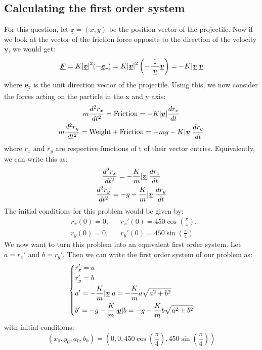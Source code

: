 \documentclass[12pt]{article}
\newcommand{\vect}[1]{\underline{\boldsymbol{#1}}}
\begin{document}
\subsection{Calculating the first order system}
For this question, let $\vect{r}=(x,y)$ be the position vector of the projectile. Now if we look at the vector of the friction force opposite to the direction of the velocity $\vect{v}$, we would get:
\begin{equation*}
  \vect{F} = K\abs{\vect{v}}^2(-\vect{e}_r) = K\abs{\vect{v}}^2\left(-\frac{1}{\abs{\vect{v}}}\vect{v}\right) = -K\abs{\vect{v}}\vect{v}
\end{equation*}
where $\vect{e_r}$ is the unit direction vector of the projectile. Using this, we now consider the forces acting on the particle in the x and y axis:
\begin{gather*}
  m\dv[2]{r_x}{t} = \text{Friction} = -K\abs{\vect{v}}\dv{r_x}{t} \\
  m\dv[2]{r_y}{t} = \text{Weight} + \text{Friction} = -mg - K\abs{\vect{v}}\dv{r_y}{t}
\end{gather*}
where $r_x$ and $r_y$ are respective functions of t of their vector entries. Equivalently, we can write this as:
\begin{gather*}
  \dv[2]{r_x}{t} = -\frac{K}{m}\abs{\vect{v}}\dv{r_x}{t} \\
  \dv[2]{r_y}{t} = -g - \frac{K}{m}\abs{\vect{v}}\dv{r_y}{t}
\end{gather*}
The initial conditions for this problem would be given by:
\begin{align*}
  &r_x(0) = 0,   &&r_x'(0) = 450\cos(\frac{\pi}{4}), \\
  &r_y(0) = 0,   &&r_y'(0) = 450\sin(\frac{\pi}{4})
\end{align*}
We now want to turn this problem into an equivalent first order system. Let $a=r_x'$ and $b=r_y'$. Then we can write the first order system of our problem as:
\begin{equation*}
  \left\{
    \begin{split}
      &r_x' = a \\
      &r_y' = b \\
      &a' = -\frac{K}{m}\abs{\vect{v}}a = -\frac{K}{m}a\sqrt{a^2+b^2} \\
      &b' = -g -\frac{K}{m}\abs{\vect{v}}b = -g -\frac{K}{m}b\sqrt{a^2+b^2}
    \end{split}
  \right.
\end{equation*}
with initial conditions:
\begin{equation*}
  (x_0,y_0,a_0,b_0) = \left(0,0, 450\cos(\frac{\pi}{4}),450\sin(\frac{\pi}{4})\right)
\end{equation*}
\end{document}
